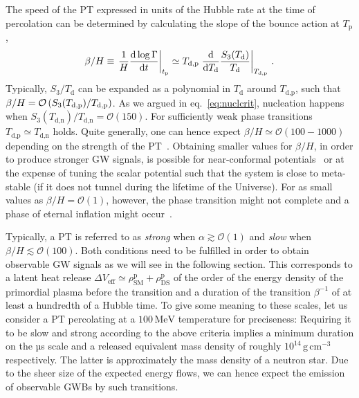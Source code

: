 The speed of the \ac{PT} expressed in units of the Hubble rate at the time of percolation can be determined by calculating  the slope of the bounce action at $T_\text{p}$,
\begin{align}
	\beta/H \equiv \left. \frac{1}{H} \frac{\mathrm d \log \Gamma}{\mathrm d t} \right|_{t_\text{p}} \simeq T_{\text{d,p}} \left. \frac{\mathop{}\!\mathrm{d}}{\mathop{}\!\mathrm{d} T_\text{d}}  \frac{S_3(T_\text{d})}{T_\text{d}} \right|_{T_\text{d,p}} \, . \label{eq:betaH}
\end{align}
Typically, $S_3 / T_\text{d}$ can be expanded as a polynomial in $T_\text{d}$ around $T_\text{d,p}$, such that $\beta/H = \mathcal{O} \left( {S_3(T_\text{d,p}) / T_\text{d,p}} \right)$.
As we argued in eq.~\eqref{eq:nuclcrit}, nucleation happens when $S_3(T_\text{d,n})/T_\text{d,n} = \mathcal{O}(150)$. For sufficiently weak phase transitions $T_\text{d,p} \simeq T_\text{d,n}$ holds. Quite generally, one can hence expect $\beta/H \simeq \mathcal{O}(100-1000)$ depending on the strength of the \ac{PT}~\cite{Bringmann:2023opz}. Obtaining smaller values for $\beta/H$, in order to produce stronger \ac{GW} signals, is possible for near-conformal potentials~\cite{Randall:2006py, Konstandin:2011dr, Ellis:2020nnr, Kierkla:2022odc, vonHarling:2017yew, Bruggisser:2018mrt, Bruggisser:2022rdm, Baldes:2021aph} or at the expense of tuning the scalar potential such that the system is close to meta-stable (if it does not tunnel during the lifetime of the Universe). For as small values as $\beta/H=\mathcal{O}(1)$, however, the phase transition might not complete and a phase of eternal inflation might occur~\cite{Randall:2006py, Konstandin:2011dr, vonHarling:2017yew, Bruggisser:2018mrt, Bruggisser:2022rdm, Baldes:2021aph, Athron:2023xlk}.

Typically, a \ac{PT} is referred to as \textit{strong} when $\alpha \gtrsim \mathcal{O}(1)$ and \textit{slow} when $\beta/H \lesssim \mathcal{O}(100)$. Both conditions need to be fulfilled in order to obtain observable \ac{GW} signals as we will see in the following section. This corresponds to a latent heat release $\Delta V_\text{eff} \simeq \rho_\text{SM}^\text{p} + \rho_\text{DS}^\text{p}  $ of  the order of the energy density of the primordial plasma before the transition and a duration of the transition $\beta^{-1}$ of at least a hundredth of a Hubble time. To give some meaning to these scales, let us consider a \ac{PT} percolating at a $100 \, \text{MeV}$ temperature for preciseness: Requiring it to be slow and strong according to the above criteria implies a minimum duration on the µs scale and a released equivalent mass density of roughly $10^{14} \, \text{g} \, \text{cm}^{-3}$ respectively. The latter is approximately the mass density of a neutron star. Due to the sheer size of the expected energy flows, we can hence expect the emission of observable \acp{GWB} by such transitions.

